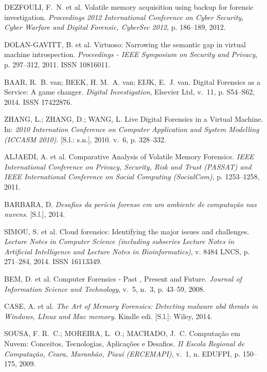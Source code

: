 \documentclass[conference]{IEEEtran}
\begin{document}
\begin{thebibliography}{1}
{DEZFOULI, F.~N. et al. {Volatile memory acquisition using backup for forensic
  investigation}.
\emph{Proceedings 2012 International Conference on Cyber Security, Cyber
  Warfare and Digital Forensic, CyberSec 2012}, p. 186--189, 2012.}
  
{DOLAN-GAVITT, B. et al. {Virtuoso: Narrowing the semantic gap in virtual
  machine introspection}.
\emph{Proceedings - IEEE Symposium on Security and Privacy}, p. 297--312, 2011.
ISSN 10816011.}

{BAAR, R.~B. van; BEEK, H. M.~A. van; EIJK, E.~J. van. {Digital Forensics as a
  Service: A game changer}.
\emph{Digital Investigation}, Elsevier Ltd, v.~11, p. S54--S62, 2014.
ISSN 17422876.}

{ZHANG, L.; ZHANG, D.; WANG, L. {Live Digital Forensics in a Virtual Machine}.
  In:  \emph{2010 Internation Conference on Computer Application and System
  Modelling (ICCASM 2010)}. [S.l.: s.n.], 2010. v.~6, p. 328--332.}
  
{ALJAEDI, A. et al. {Comparative Analysis of Volatile Memory Forensics}.
\emph{IEEE International Conference on Privacy, Security, Risk and Trust
  (PASSAT) and IEEE International Conference on Social Computing (SocialCom)},
  p. 1253--1258, 2011.}
  
{BARBARA, D. \emph{{Desafios da per{\'{i}}cia forense em um ambiente de
  computa{\c{c}}{\~{a}}o nas nuvens}}.
[S.l.], 2014.}

{SIMOU, S. et al. {Cloud forensics: Identifying the major issues and
  challenges}.
\emph{Lecture Notes in Computer Science (including subseries Lecture Notes in
  Artificial Intelligence and Lecture Notes in Bioinformatics)}, v. 8484 LNCS,
  p. 271--284, 2014.
ISSN 16113349.}

{BEM, D. et al. {Computer Forensics - Past , Present and Future}.
\emph{Journal of Information Science and Technology}, v.~5, n.~3, p. 43--59,
  2008.}
  
{CASE, A. et al. \emph{{The Art of Memory Forensics: Detecting malware abd
  threats in Windows, LInux and Mac memory}}. Kindle edi. [S.l.]: Wiley, 2014.}
  
{SOUSA, F. R.~C.; MOREIRA, L.~O.; MACHADO, J.~C. {Computa{\c{c}}{\~{a}}o em
  Nuvem: Conceitos, Tecnologias, Aplica{\c{c}}{\~{o}}es e Desafios}.
\emph{II Escola Regional de Computa{\c{c}}{\~{a}}o, Ceara, Maranh{\~{a}}o,
  Piau{\'{i}} (ERCEMAPI)}, v.~1, n. EDUFPI, p. 150--175, 2009.}
  

\end{thebibliography}
\end{document}
